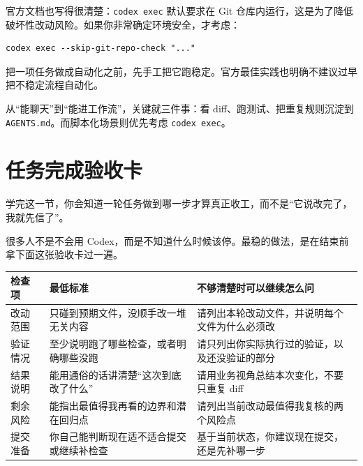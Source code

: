 \documentclass[UTF8,a4paper,12pt]{ctexart}
\begin{document}
官方文档也写得很清楚：\texttt{codex exec} 默认要求在 Git 仓库内运行，这是为了降低破坏性改动风险。如果你非常确定环境安全，才考虑：

\begin{lstlisting}[style=cli]
codex exec --skip-git-repo-check "..."
\end{lstlisting}

\begin{warnbox}
把一项任务做成自动化之前，先手工把它跑稳定。官方最佳实践也明确不建议过早把不稳定流程自动化。
\end{warnbox}

\begin{sumbox}
从“能聊天”到“能进工作流”，关键就三件事：看 diff、跑测试、把重复规则沉淀到 \texttt{AGENTS.md}。而脚本化场景则优先考虑 \texttt{codex exec}。
\end{sumbox}

\section{任务完成验收卡}

\begin{learnbox}
学完这一节，你会知道一轮任务做到哪一步才算真正收工，而不是“它说改完了，我就先信了”。
\end{learnbox}

很多人不是不会用 Codex，而是不知道什么时候该停。最稳的做法，是在结束前拿下面这张验收卡过一遍。

\begin{longtable}{>{\raggedright\arraybackslash}p{} >{\raggedright\arraybackslash}p{} >{\raggedright\arraybackslash}p{}}
\toprule
检查项 & 最低标准 & 不够清楚时可以继续怎么问 \\
\midrule
\endhead
改动范围 & 只碰到预期文件，没顺手改一堆无关内容 & 请列出本轮改动文件，并说明每个文件为什么必须改 \\
验证情况 & 至少说明跑了哪些检查，或者明确哪些没跑 & 请只列出你实际执行过的验证，以及还没验证的部分 \\
结果说明 & 能用通俗的话讲清楚“这次到底改了什么” & 请用业务视角总结本次变化，不要只重复 diff \\
剩余风险 & 能指出最值得我再看的边界和潜在回归点 & 请列出当前改动最值得我复核的两个风险点 \\
提交准备 & 你自己能判断现在适不适合提交或继续补检查 & 基于当前状态，你建议现在提交，还是先补哪一步 \\
\bottomrule
\end{longtable}
\end{document}
